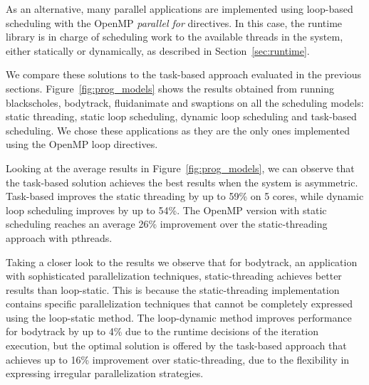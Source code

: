 As an alternative, many parallel applications are implemented using loop-based scheduling with the 
OpenMP \emph{parallel for} directives. 
In this case, the runtime library is in charge of scheduling work to the available threads in the system, either statically or dynamically, as described in Section~\ref{sec:runtime}.

We compare these solutions to the task-based approach evaluated in the previous sections. 
Figure~\ref{fig:prog_models} shows the results obtained from running blackscholes, bodytrack, fluidanimate and swaptions on all the scheduling models: static threading, static loop scheduling, dynamic loop scheduling and task-based scheduling. 
We chose these applications as they are the only ones implemented using the OpenMP loop directives.

Looking at the average results in Figure~\ref{fig:prog_models}, we can observe that the task-based solution 
achieves the best results when the system is asymmetric. Task-based improves the static 
threading by up to 59\% on 5 cores, while dynamic loop scheduling improves by up to 54\%.
The OpenMP version with static scheduling reaches an average 26\% improvement over the static-threading approach with pthreads.

Taking a closer look to the results we observe that for bodytrack, an application with sophisticated parallelization techniques, static-threading achieves better results than loop-static.
This is because the static-threading implementation contains specific parallelization techniques that cannot be completely expressed using the loop-static method.
The loop-dynamic method improves performance for bodytrack by up to 4\% due to the runtime decisions of the iteration execution, but the optimal solution is offered by the task-based approach that achieves up to 16\% improvement over static-threading, due to the flexibility in expressing irregular parallelization strategies.
  
